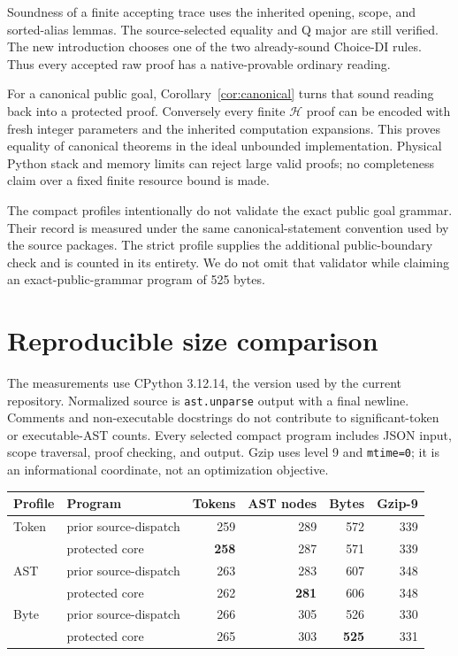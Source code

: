 \documentclass[11pt,letterpaper]{article}
\theoremstyle{definition}\newtheorem{definition}[theorem]{Definition}
\theoremstyle{remark}\newtheorem{remark}[theorem]{Remark}
\newcommand{\Hcal}{\mathcal H}\newcommand{\Kcal}{\mathcal K}
\newcommand{\file}[1]{{\urlstyle{tt}\nolinkurl{#1}}}
\begin{document}
Soundness of a finite accepting trace uses the inherited opening,
scope, and sorted-alias lemmas. The source-selected equality and Q
major are still verified. The new introduction chooses one of the two
already-sound Choice-DI rules. Thus every accepted raw proof has a
native-provable ordinary reading.

For a canonical public goal, Corollary~\ref{cor:canonical} turns that
sound reading back into a protected proof. Conversely every finite
\(\Hcal\) proof can be encoded with fresh integer parameters and
the inherited computation expansions. This proves equality of
canonical theorems in the ideal unbounded implementation. Physical
Python stack and memory limits can reject large valid proofs; no
completeness claim over a fixed finite resource bound is made.

The compact profiles intentionally do not validate the exact public
goal grammar. Their record is measured under the same
canonical-statement convention used by the source packages. The
strict profile supplies the additional public-boundary check and is
counted in its entirety. We do not omit that validator while claiming
an exact-public-grammar program of 525 bytes.

\section{Reproducible size comparison}\label{sec:metrics}

The measurements use CPython 3.12.14, the version used by the current
repository. Normalized source is \file{ast.unparse} output with a
final newline. Comments and non-executable docstrings do not contribute
to significant-token or executable-AST counts. Every selected compact
program includes JSON input, scope traversal, proof checking, and
output. Gzip uses level 9 and \file{mtime=0}; it is an informational
coordinate, not an optimization objective.

\begin{center}\small
\begin{tabular}{llrrrr}
\toprule
Profile & Program & Tokens & AST nodes & Bytes & Gzip-9\\
\midrule
Token & prior source-dispatch & 259 & 289 & 572 & 339\\
      & protected core & \textbf{258} & 287 & 571 & 339\\
AST   & prior source-dispatch & 263 & 283 & 607 & 348\\
      & protected core & 262 & \textbf{281} & 606 & 348\\
Byte  & prior source-dispatch & 266 & 305 & 526 & 330\\
      & protected core & 265 & 303 & \textbf{525} & 331\\
\bottomrule
\end{tabular}
\end{center}
\end{document}
